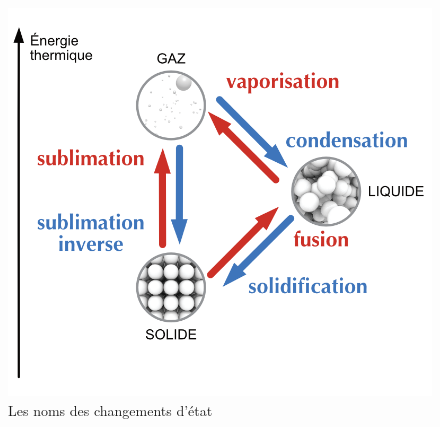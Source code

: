 \documentclass[
  11pt,
  a4paper,
  openany]{book}
\begin{document}
\newpage

\begin{figure}

{\centering \includegraphics[width=0.45\linewidth]{images/chgt-etats} 

}

\caption{Les noms des changements d'état}\label{fig:chgt-etats}
\end{figure}
\end{document}
